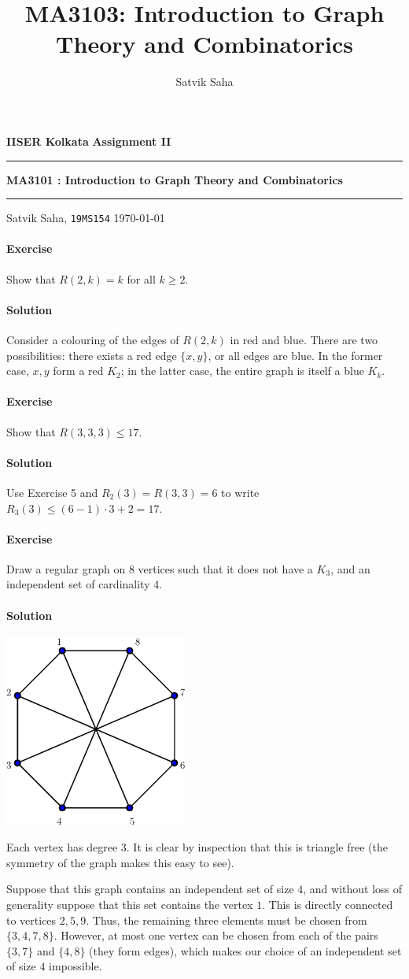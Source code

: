 \documentclass[10pt]{article}
\title{MA3103: Introduction to Graph Theory and Combinatorics}
\author{Satvik Saha}
\date{}
\newcounter{prob}
\newcommand{\problem}{\stepcounter{prob}\paragraph{Exercise \arabic{prob}}}
\newcommand{\solution}{\paragraph{Solution}}
\begin{document}
    \noindent\textbf{IISER Kolkata} \hfill \textbf{Assignment II}
    \vspace{3pt}
    \hrule
    \vspace{3pt}
    \begin{center}
    \LARGE{\textbf{MA3101 : Introduction to Graph Theory and Combinatorics}}
    \end{center}
    \vspace{3pt}
    \hrule
    \vspace{3pt}
    Satvik Saha, \texttt{19MS154} \hfill \today
    \vspace{20pt}

    \problem Show that $R(2, k) = k$ for all $k \geq 2$.

    \solution Consider a colouring of the edges of $R(2, k)$ in red and blue. There
    are two possibilities: there exists a red edge $\{x, y\}$, or all edges are blue.
    In the former case, $x, y$ form a red $K_2$; in the latter case, the entire graph
    is itself a blue $K_k$.

    \problem Show that $R(3, 3, 3) \leq 17$.

    \solution Use Exercise 5 and $R_2(3) = R(3, 3) = 6$ to write $R_3(3) \leq (6 -
    1)\cdot 3 + 2 = 17$.

    \problem Draw a regular graph on 8 vertices such that it does not have a $K_3$,
    and an independent set of cardinality 4.

    \solution 

    \begin{center}
        \includegraphics[width=0.45\textwidth]{./octagon_diags.eps}
    \end{center}

    Each vertex has degree $3$. It is clear by inspection that this is triangle free
    (the symmetry of the graph makes this easy to see).

    Suppose that this graph contains an independent set of size $4$, and without loss
    of generality suppose that this set contains the vertex $1$. This is directly
    connected to vertices $2, 5, 9$. Thus, the remaining three elements must be
    chosen from $\{3, 4, 7, 8\}$. However, at most one vertex can be chosen from
    each of the pairs $\{3, 7\}$ and $\{4, 8\}$ (they form edges), which makes our
    choice of an independent set of size $4$ impossible.
\end{document}
